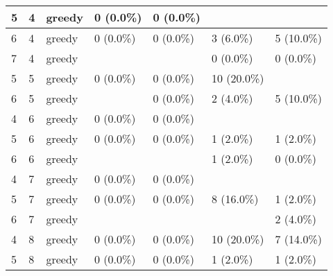 \documentclass[oneside,canadian,landscape]{article}
\begin{document}
\begin{center}
\begin{longtable}{|l|l|l||l|l|l|l|}
5&4&greedy&0 (0.0\%)&0 (0.0\%)&&\\ \hline
6&4&greedy&0 (0.0\%)&0 (0.0\%)&3 (6.0\%)&5 (10.0\%)\\ \hline
7&4&greedy&&&0 (0.0\%)&0 (0.0\%)\\ \hline
5&5&greedy&0 (0.0\%)&0 (0.0\%)&10 (20.0\%)&\\ \hline
6&5&greedy&&0 (0.0\%)&2 (4.0\%)&5 (10.0\%)\\ \hline
4&6&greedy&0 (0.0\%)&0 (0.0\%)&&\\ \hline
5&6&greedy&0 (0.0\%)&0 (0.0\%)&1 (2.0\%)&1 (2.0\%)\\ \hline
6&6&greedy&&&1 (2.0\%)&0 (0.0\%)\\ \hline
4&7&greedy&0 (0.0\%)&0 (0.0\%)&&\\ \hline
5&7&greedy&0 (0.0\%)&0 (0.0\%)&8 (16.0\%)&1 (2.0\%)\\ \hline
6&7&greedy&&&&2 (4.0\%)\\ \hline
4&8&greedy&0 (0.0\%)&0 (0.0\%)&10 (20.0\%)&7 (14.0\%)\\ \hline
5&8&greedy&0 (0.0\%)&0 (0.0\%)&1 (2.0\%)&1 (2.0\%)\\ \hline
\end{longtable}
\end{center}
\end{document}
